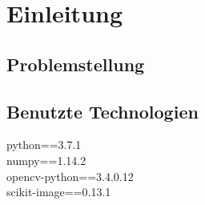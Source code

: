 \chapter{Einleitung}

\section{Problemstellung}

\section{Benutzte Technologien}
python==3.7.1 \\
numpy==1.14.2 \\
opencv-python==3.4.0.12 \\
scikit-image==0.13.1

